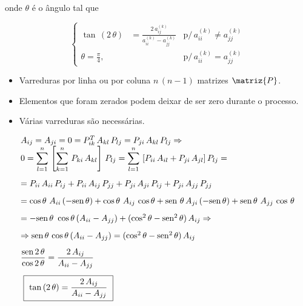 \noindent
onde $ \theta $ é o ângulo tal que

\begin{equation}
 \left\{
 \begin{array}{lll}
  \tan \, (2 \, \theta)   & = \displaystyle \frac{2 \, a_{ij}^{(k)}}{a_{ii}^{(k)} - a_{jj}^{(k)}} & \mbox{p/} \, a_{ii}^{(k)} \neq a_{jj}^{(k)} \\
  \theta = \displaystyle \frac{\pi}{4}, & 							                  & \mbox{p/} \, a_{ii}^{(k)} = a_{jj}^{(k)}
 \end{array}
 \right.
\end{equation}

\begin{itemize}

\item Varreduras por linha ou por coluna $ n \, (n - 1) $ matrizes $ \matriz{P} $.

\item Elementos que foram zerados podem deixar de ser zero durante o processo.

\item Várias varreduras são necessárias.

\end{itemize}

\[
\begin{array}{l}
 A_{ij} = A_{ji} = 0 = P_{ik}^T \, A_{kl} \, P_{lj} = P_{ji} \, A_{kl} \, P_{lj} \Rightarrow \\ \vspace*{0.3cm}
 0 = \displaystyle \sum_{l=1}^n \, \left[ \sum_{k=1}^n \, P_{ki} \, A_{kl} \right] \, P_{lj} = \sum_{l=1}^n \, \left[ P_{ii} \, A_{il} + P_{ji} \, A_{jl} \right] P_{lj} = \\ \vspace*{0.3cm}
 = P_{ii} \, A_{ii} \, P_{ij} + P_{ii} \, A_{ij} \, P_{jj} + P_{ji} \, A_{ji} \, P_{ij} + P_{ji} \, A_{jj} \, P_{jj} \\ \vspace*{0.3cm}
 = \cos \theta \, \, A_{ii} \, (-\mbox{sen} \, \theta) + \cos \theta \, \, A_{ij} \, \cos \theta + \mbox{sen} \, \, \theta \, A_{ji} \, (-\mbox{sen} \, \theta) + \mbox{sen} \, \theta \, \, A_{jj} \, \cos \, \theta\\ \vspace*{0.3cm}
 = -\mbox{sen} \, \theta \, \, \cos \theta \, (A_{ii} - A_{jj}) + (\cos^2 \theta - \mbox{sen}^2 \, \theta) \, A_{ij} \Rightarrow \\ \vspace*{0.3cm}
 \Rightarrow \mbox{sen} \, \theta \, \cos \theta \, (A_{ii} - A_{jj}) = (\cos^2 \theta - \mbox{sen}^2 \, \theta) \, A_{ij}\\ \vspace*{0.3cm}
 \displaystyle \frac{\mbox{sen} \, 2 \, \theta}{\cos 2 \, \theta} = \frac{2 \, A_{ij}}{A_{ii} - A_{jj}}\\ \vspace*{0.3cm}
 \mbox{ \framebox{ $ \tan \, (2 \, \theta) = \displaystyle \frac{2 \, A_{ij}}{A_{ii} - A_{jj}} $ } }
\end{array}
\]

